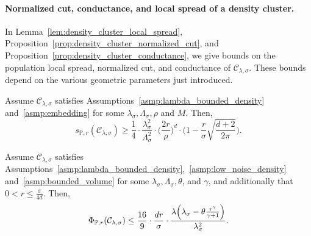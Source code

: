 \documentclass[11pt,twoside]{article}
\newcommand{\1}{\mathbf{1}}
\newcommand{\mc}[1]{\mathcal{#1}}
\newcommand{\Pbb}{\mathbb{P}}
\begin{document}
\paragraph{Normalized cut, conductance, and local spread of a density cluster.} In Lemma~\ref{lem:density_cluster_local_spread}, Proposition~\ref{prop:density_cluster_normalized_cut}, and Proposition~\ref{prop:density_cluster_conductance}, we give bounds on the population local spread, normalized cut, and conductance of $\mc{C}_{\lambda,\sigma}$. These bounds depend on the various geometric parameters just introduced. 
\begin{lemma}
	\label{lem:density_cluster_local_spread}
	Assume $\mc{C}_{\lambda,\sigma}$ satisfies Assumptions~\ref{asmp:lambda_bounded_density} and~\ref{asmp:embedding} for some $\lambda_{\sigma},\Lambda_{\sigma},\rho$ and $M$. Then,
	\begin{equation}
	\label{eqn:density_cluster_local_spread}
	s_{\Pbb,r}(\mc{C}_{\lambda,\sigma}) \geq \frac{1}{4} \cdot \frac{\lambda_{\sigma}^2}{\Lambda_{\sigma}^2} \cdot \biggl(\frac{2r}{\rho}\biggr)^{d} \cdot \biggl(1 - \frac{r}{\sigma} \sqrt{\frac{d + 2}{2\pi}}\biggr).
	\end{equation}
\end{lemma}

\begin{proposition}
	\label{prop:density_cluster_normalized_cut}
	Assume $\mc{C}_{\lambda,\sigma}$ satisfies Assumptions~\ref{asmp:lambda_bounded_density},~\ref{asmp:low_noise_density} and~\ref{asmp:bounded_volume} for some $\lambda_{\sigma}, \Lambda_{\sigma}, \theta$, and $\gamma$, and additionally that $0 < r \leq \frac{\sigma}{4d}$. Then,
	\begin{equation}
	\label{eqn:density_cluster_normalized_cut}
	\Phi_{\Pbb,r}(\mc{C}_{\lambda,\sigma}) \leq \frac{16}{9} \cdot \frac{dr}{\sigma} \cdot \frac{\lambda\Bigl(\lambda_{\sigma} - \theta \frac{r^{\gamma}}{\gamma + 1}\Bigr)}{\lambda_{\sigma}^2}.
	\end{equation}
\end{proposition}
\end{document}
